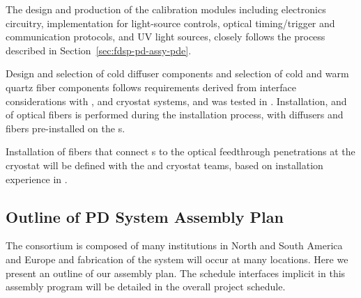 The design and production of the calibration modules including electronics circuitry,   implementation for light-source controls, optical timing/trigger and  communication protocols, and UV light sources, closely follows the process described in Section~\ref{sec:fdsp-pd-assy-pde}.

Design and selection of cold diffuser components and selection of cold and warm quartz fiber components follows requirements derived from interface considerations with ,   and cryostat systems,  
and was tested in .
Installation,  and  of optical fibers is performed during the  installation process, with diffusers and  fibers pre-installed on the s.

Installation of fibers that connect s %
to the optical feedthrough penetrations at the cryostat will be defined with the  and cryostat teams, based on installation experience in . 

\subsection{Outline of PD System Assembly Plan}
\label{sec:fdsp-pd-assy-Assby-plan}

The   consortium is composed of many institutions in North and South America and Europe and fabrication of the system will occur at many locations. %
Here we present an outline of our assembly %
plan.  The schedule interfaces implicit in this assembly program will be detailed in the overall project schedule.

